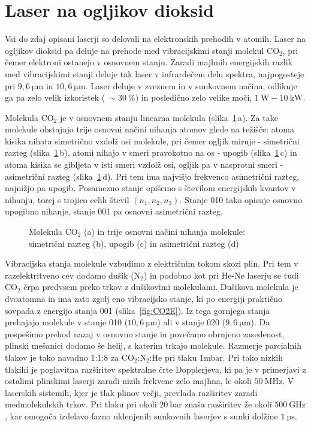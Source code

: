 \section{Laser na ogljikov dioksid}

Vsi do zdaj opisani laserji so delovali na elektronskih prehodih v atomih. 
Laser na ogljikov dioksid pa deluje na prehode med vibracijskimi stanji molekul 
CO$_2$, pri čemer elektroni ostanejo v osnovnem stanju.
Zaradi majhnih energijskih razlik med vibracijskimi stanji deluje
tak laser v infrardečem delu spektra, najpogosteje pri 
$9,6~\si{\micro\metre}$ in $10,6~\si{\micro\metre}$. Laser deluje v zveznem
in v sunkovnem načinu, odlikuje ga pa zelo velik izkoristek ($~\sim 30~\%$) in 
posledično zelo velike moči, $1~\si{\watt} - 10~\si{\kilo\watt}$. 

Molekula CO$_2$ je v osnovnem stanju linearna molekula (slika~\ref{fig:CO2}\,a). 
Za take molekule obstajajo trije osnovni načini nihanja atomov glede na težišče:
atoma kisika nihata simetrično vzdolž osi molekule, pri čemer ogljik miruje -
simetrični razteg (slika~\ref{fig:CO2}\,b), atomi nihajo v smeri pravokotno na 
os - upogib (slika~\ref{fig:CO2}\,c) in atoma kisika se gibljeta v isti smeri 
vzdolž osi, ogljik pa v nasprotni smeri - asimetrični razteg (slika~\ref{fig:CO2}\,d). 
Pri tem ima najvišjo frekvenco asimetrični razteg, najnižjo pa upogib. 
Posamezno stanje opišemo s številom energijskih kvantov 
v nihanju, torej s trojico celih števil $(n_1,n_2,n_3)$. Stanje 010 tako 
opisuje osnovno upogibno nihanje, stanje 001 pa osnovni asimetrični razteg.

\begin{figure}[h]
\centering
\def\svgwidth{100truemm} 

\caption{Molekula CO$_2$ (a) in trije osnovni načini nihanja molekule:
simetrični razteg (b), upogib (c) in asimetrični razteg (d)}
\label{fig:CO2}
\end{figure}

Vibracijska stanja molekule vzbudimo z električnim tokom skozi plin. Pri 
tem v razelektritveno cev dodamo dušik (N$_2$) in podobno kot pri He-Ne laserju
se tudi CO$_2$ črpa predvsem preko trkov z dušikovimi molekulami. 
Dušikova molekula je dvoatomna in ima zato zgolj eno vibracijsko stanje, ki po energiji
praktično sovpada z energijo stanja 001 (slika~\ref{fig:CO2E}). Iz tega gornjega
stanja prehajajo molekule v stanje 010 ($10,6~\si{\micro\metre}$) ali v stanje
020 ($9,6~\si{\micro\metre}$). Da pospešimo prehod nazaj v osnovno stanje in povečamo
obrnjeno zasedenost, plinski mešanici dodamo še helij, s katerim trkajo molekule.
Razmerje parcialnih tlakov je tako navadno 1:1:8 za CO$_2$:N$_2$:He pri tlaku $1\si{\milli\bar}$. 
Pri tako nizkih tlakihi je poglavitna razširitev spektralne črte Dopplerjeva, ki 
pa je v primerjavi z ostalimi plinskimi laserji zaradi nizih frekvenc zelo majhna,
le okoli $50~\si{\mega\hertz}$. V laserskih sistemih, kjer je tlak plinov večji,
prevlada razširitev zaradi medmolekulskih trkov. Pri tlaku pri okoli $20~\si{\bar}$
znaša razširitev že okoli $500~\si{\giga\hertz}$, kar omogoča izdelavo fazno uklenjenih 
sunkovnih laserjev s sunki dolžine $1~\si{\pico\second}$. 

